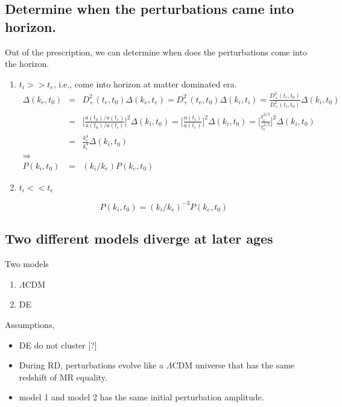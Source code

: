\documentclass{article}
\begin{document}
\subsection{Determine when the perturbations came into horizon.}
Out of the prescription, we can determine when does the perturbations come into the horizon.

\begin{enumerate}
\item
$t_i>>t_e$, i.e., come into horizon at matter dominated era.
\begin{eqnarray}
\Delta(k_e,t_0)&=&D_+^2(t_e,t_0)\Delta(k_e,t_e)=D_+^2(t_e,t_0)\Delta(k_i,t_i)=\frac{D_+^2(t_e,t_0)}{D_+^2(t_i,t_0)}\Delta(k_i,t_0) \\
&=&\bigg[\frac{a(t_0)/a(t_e)}{a(t_0)/a(t_i)}\bigg]^2\Delta(k_i,t_0)=\bigg[ \frac{a(t_i)}{a(t_e)} \bigg]^2\Delta(k_i,t_0)=\bigg[ \frac{t_i^{2/3}}{t_e^{2/3}} \bigg]^2\Delta(k_i,t_0) \\
&=&\frac{k_e^4}{k_i^4}\Delta(k_i,t_0) \\
\Rightarrow  \nonumber \\ 
P(k_i,t_0)&=&(k_i/k_e)P(k_e,t_0)
\end{eqnarray}



\item
$t_i<<t_e$

\begin{equation}
P(k_i,t_0)=(k_i/k_e)^{-3}P(k_e,t_0)
\end{equation}

\end{enumerate}






\subsection{Two different models diverge at later ages}

Two models
\begin{enumerate}
\item $\Lambda$CDM
\item DE
\end{enumerate}



Assumptions,
\begin{itemize}
\item  DE do not cluster [?]
\item  During RD, perturbations evolve like a $\Lambda$CDM universe that has the same redshift of MR equality.
\item  model 1 and model 2 has the same initial perturbation amplitude.
\end{itemize}
\end{document}
